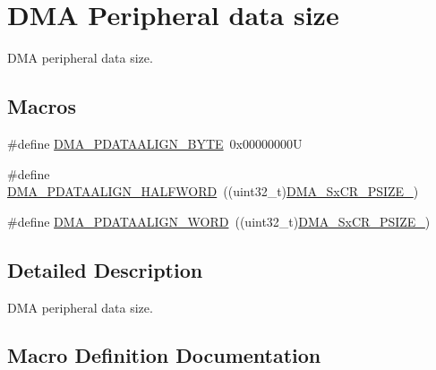 \hypertarget{group___d_m_a___peripheral__data__size}{}\section{D\+MA Peripheral data size}
\label{group___d_m_a___peripheral__data__size}


D\+MA peripheral data size.  


\subsection*{Macros}
\begin{DoxyCompactItemize}
\item 
\#define \mbox{\hyperlink{group___d_m_a___peripheral__data__size_ga55b8c8f5ec95f10d26d6c5b1c9136730}{D\+M\+A\+\_\+\+P\+D\+A\+T\+A\+A\+L\+I\+G\+N\+\_\+\+B\+Y\+TE}}~0x00000000U
\item 
\#define \mbox{\hyperlink{group___d_m_a___peripheral__data__size_gac08bfd907442dba5358830b247135bcc}{D\+M\+A\+\_\+\+P\+D\+A\+T\+A\+A\+L\+I\+G\+N\+\_\+\+H\+A\+L\+F\+W\+O\+RD}}~((uint32\+\_\+t)\mbox{\hyperlink{group___peripheral___registers___bits___definition_gab05cf3e3f7c9edae5c70d59b3b75b14f}{D\+M\+A\+\_\+\+Sx\+C\+R\+\_\+\+P\+S\+I\+Z\+E\+\_}})
\item 
\#define \mbox{\hyperlink{group___d_m_a___peripheral__data__size_gaad50e97cbc4a726660db9c3f42ac93b0}{D\+M\+A\+\_\+\+P\+D\+A\+T\+A\+A\+L\+I\+G\+N\+\_\+\+W\+O\+RD}}~((uint32\+\_\+t)\mbox{\hyperlink{group___peripheral___registers___bits___definition_ga8f376d0900380a3045cbeadd6a037302}{D\+M\+A\+\_\+\+Sx\+C\+R\+\_\+\+P\+S\+I\+Z\+E\+\_}})
\end{DoxyCompactItemize}


\subsection{Detailed Description}
D\+MA peripheral data size. 



\subsection{Macro Definition Documentation}
\mbox{\label{group___d_m_a___peripheral__data__size_ga55b8c8f5ec95f10d26d6c5b1c9136730}} 
